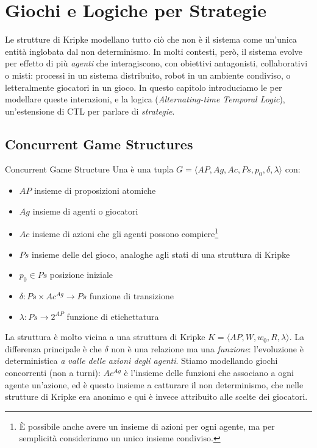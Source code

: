 \chapter{Giochi e Logiche per Strategie}\label{ch:atl}

Le strutture di Kripke modellano tutto ciò che non è il sistema come un'unica entità inglobata dal non determinismo. In molti contesti, però, il sistema evolve per effetto di più \emph{agenti} che interagiscono, con obiettivi antagonisti, collaborativi o misti: processi in un sistema distribuito, robot in un ambiente condiviso, o letteralmente giocatori in un gioco. In questo capitolo introduciamo le  per modellare queste interazioni, e la logica  (\textit{Alternating-time Temporal Logic}), un'estensione di CTL per parlare di \emph{strategie}.

\section{Concurrent Game Structures}

\begin{definition}{Concurrent Game Structure}
  Una  è una tupla \(G=\langle AP, Ag, Ac, Ps, p_0, \delta, \lambda \rangle\) con:
  \begin{itemize}
    \item \(AP\) insieme di proposizioni atomiche
    \item \(Ag\) insieme di agenti o giocatori
    \item \(Ac\) insieme di azioni che gli agenti possono compiere\footnote{È possibile anche avere un insieme di azioni per ogni agente, ma per semplicità consideriamo un unico insieme condiviso.}
    \item \(Ps\) insieme delle  del gioco, analoghe agli stati di una struttura di Kripke
    \item \(p_0 \in Ps\) posizione iniziale
    \item \(\delta: Ps \times Ac^{Ag} \to Ps\) funzione di transizione
    \item \(\lambda: Ps \to 2^{AP}\) funzione di etichettatura
  \end{itemize}
\end{definition}

La struttura è molto vicina a una struttura di Kripke \(K=\langle AP,W,w_0,R,\lambda\rangle\). La differenza principale è che \(\delta\) non è una relazione ma una \emph{funzione}: l'evoluzione è deterministica \emph{a valle delle azioni degli agenti}. Stiamo modellando giochi concorrenti (non a turni): \(Ac^{Ag}\) è l'insieme delle funzioni che associano a ogni agente un'azione, ed è questo insieme a catturare il non determinismo, che nelle strutture di Kripke era anonimo e qui è invece attribuito alle scelte dei giocatori.

